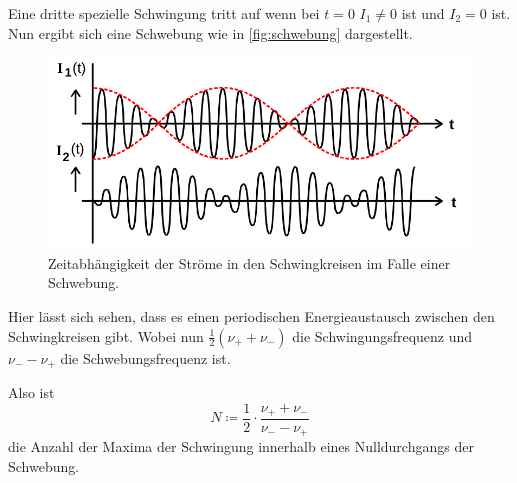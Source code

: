 Eine dritte spezielle Schwingung tritt auf wenn bei $t=0$ $I_1 \neq 0$ ist und $I_2 = 0$ ist. Nun ergibt sich eine Schwebung wie in \autoref{fig:schwebung} dargestellt.
\begin{figure}
    \centering
    \includegraphics[width=\textwidth/2]{images/schwebung.png}
    \caption{Zeitabhängigkeit der Ströme in den Schwingkreisen im Falle einer Schwebung. \cite{V355}}
    \label{fig:schwebung}
\end{figure}

Hier lässt sich sehen, dass es einen periodischen Energieaustausch zwischen den Schwingkreisen gibt. 
Wobei nun $\frac{1}{2} (\nu _+ + \nu _-)$ die Schwingungsfrequenz und $\nu _- - \nu _+$ die Schwebungsfrequenz ist.\cite{V355}

Also ist 
\begin{equation}
    \label{eq:extrema}
    N \coloneq \frac{1}{2} \cdot \frac{ \nu _+ + \nu _-}{\nu _- - \nu _+}
\end{equation}
die Anzahl der Maxima der Schwingung innerhalb eines Nulldurchgangs der Schwebung.